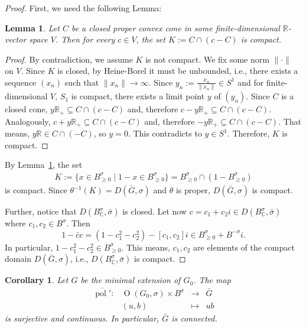 \documentclass[a4paper,oneside,11pt]{amsart}
\DeclareMathOperator{\OO}{O}
\DeclareMathOperator{\pol}{pol}
\newcommand{\R}{\mathbb R}
\theoremstyle{plain}
\newtheorem{cor}[teo]{Corollary}
\newtheorem{lem}[teo]{Lemma}
\theoremstyle{definition}
\theoremstyle{remark}
\begin{document}
\begin{proof} First, we need the following Lemma:

\begin{lem}\label{comp_cone}
    Let $C$ be a closed proper convex cone in some finite-dimensional $\R$-vector space $V$. Then for every $c\in V$, the set $K:=C\cap(c-C)$ is compact.
\end{lem}

\begin{proof}
    By contradiction, we assume $K$ is not compact. We fix some norm $\|\cdot\|$ on $V$. Since $K$ is closed, by Heine-Borel it must be unbounded, i.e., there exists a sequence $(x_n)$ such that $\|x_n\|\to\infty$. Since $y_n:=\frac{x_n}{\|x_n\|}\in S^1$ and for finite-dimensional $V$, $S_1$ is compact, there exists a limit point $y$ of $(y_n)$. Since $C$ is a closed cone, $y\R_+\subseteq C\cap(c-C)$ and, therefore $c-y\R_+\subseteq C\cap(c-C)$. Analogously, $c+y\R_+\subseteq C\cap(c-C)$ and, therefore $-y\R_+\subseteq C\cap(c-C)$. That means, $y\R\in C\cap(-C)$, so $y=0$. This contradicts to $y\in S^1$. Therefore, $K$ is compact.
\end{proof}


    \noindent By Lemma~\ref{comp_cone}, the set
    \begin{align*}
        K:=\{x\in B^{\sigma}_{\geq 0}\mid 1-x\in B^{\sigma}_{\geq 0}\}=B^{\sigma}_{\geq 0}\cap(1-B^{\sigma}_{\geq 0})
    \end{align*}
    is compact. Since $\theta^{-1}(K)=D(\bar G,\sigma)$ and $\theta$ is proper, $D(\bar G,\sigma)$ is compact.

    Further, notice that $D(B_\mathbb C^\sigma,\bar\sigma)$ is closed. Let now $c=c_1+c_2i\in D(B_\mathbb C^\sigma,\bar\sigma)$ where $c_1,c_2\in B^\sigma$. Then 
    $$1-\bar cc=(1-c_1^2-c_2^2)-[c_1,c_2]i\in B^\sigma_{\geq 0} +B^{-\sigma}i.$$
    In particular, $1-c_1^2-c_2^2\in B^\sigma_{\geq 0}$. This means, $c_1,c_2$ are elements of the compact domain $D(\bar G,\sigma)$, i.e., $D(B_\mathbb C^\sigma,\bar\sigma)$ is compact.
\end{proof}

\begin{cor}
Let $G$ be the minimal extension of $G_0$. The map
$$\begin{matrix}
\overline{\pol'}\colon & \OO(G_0,\sigma)\times B^{\sigma} & \to & \bar G \\
& (u,b) & \mapsto & ub
\end{matrix}$$
is surjective and continuous. In particular, $\bar G$ is connected.
\end{cor}
\end{document}
